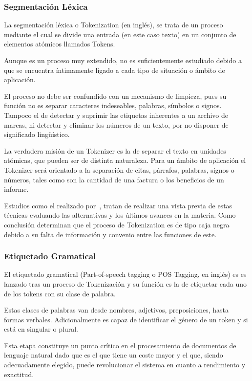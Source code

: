 \documentclass[runningheads,a4paper]{llncs}
\theoremstyle{break}
\begin{document}
\subsubsection{Segmentación Léxica}
\textbf{}

La segmentación léxica o Tokenization (en inglés), se trata de un proceso mediante el cual se divide una entrada (en este caso texto) en un conjunto de elementos atómicos llamados Tokens. 

Aunque es un proceso muy extendido, no es suficientemente estudiado debido a que se encuentra íntimamente ligado a cada tipo de situación o ámbito de aplicación.

El proceso no debe ser confundido con un mecanismo de limpieza, pues su función no es separar caracteres indeseables, palabras, símbolos o signos. Tampoco el de detectar y suprimir las etiquetas inherentes a un archivo de marcas, ni detectar y eliminar los números de un texto, por no disponer de significado lingüístico. 

La verdadera misión de un Tokenizer es la de separar el texto en unidades atómicas, que pueden ser de distinta naturaleza. Para un ámbito de aplicación el Tokenizer será orientado a la separación de citas, párrafos, palabras, signos o números, tales como son la cantidad de una factura o los beneficios de un informe.

Estudios como el realizado por~\cite{tokenization:1}, tratan de realizar una vista previa de estas técnicas evaluando las alternativas y los últimos avances en la materia. Como conclusión determinan que el proceso de Tokenization es de tipo caja negra debido a su falta de información y convenio entre las funciones de este.

\subsubsection{Etiquetado Gramatical}
\textbf{}

El etiquetado gramatical (Part-of-speech tagging o POS Tagging, en inglés) es es lanzado tras un proceso de Tokenización y su función es la de etiquetar cada uno de los tokens con su clase de palabra. 

Estas clases de palabras van desde nombres, adjetivos, preposiciones, hasta formas verbales. Adicionalmente es capaz de identificar el género de un token y si está en singular o plural.

Esta etapa constituye un punto crítico en el procesamiento de documentos de lenguaje natural dado que es el que tiene un coste mayor  y el que, siendo adecuadamente elegido, puede revolucionar el sistema en cuanto a rendimiento y exactitud. 
\end{document}
